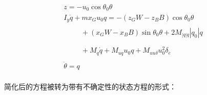 \begin{equation}
\begin{array}{l}
 z =  - {u_0}\cos {\theta _0}\theta  \\
 {I_y}\dot q + m{x_G}{u_0}q =  - ({z_G}W - {z_B}B)\cos {\theta _0}\theta  \\
 \begin{array}{*{20}{c}}
   {\begin{array}{*{20}{c}}
   {} & {}  \\
\end{array}}  \\
\end{array} + ({x_G}W - {x_B}B)\sin {\theta _0}\theta  + 2{M_{\left| q \right|q}}\left| {{q_0}} \right|q \\
 \begin{array}{*{20}{c}}
   {\begin{array}{*{20}{c}}
   {} & {}  \\
\end{array}}  \\
\end{array} + {M_{\dot q}}\dot q + {M_{uq}}{u_0}q + {M_{uu\delta }}u_0^2{\delta _e} \\
 \dot \theta  = q \\
 \end{array}
\end{equation}

简化后的方程被转为带有不确定性的状态方程的形式：

